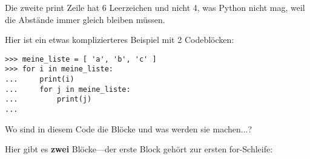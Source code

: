 Die zweite print Zeile hat 6 Leerzeichen und nicht 4, was Python nicht mag, weil die Abstände immer gleich bleiben müssen.


\par
Hier ist ein etwas komplizierteres Beispiel mit 2 Codeblöcken:

\begin{listing}
\begin{verbatim}
>>> meine_liste = [ 'a', 'b', 'c' ]
>>> for i in meine_liste:
...     print(i)
...     for j in meine_liste:
...         print(j)
...
\end{verbatim}
\end{listing}

\noindent
Wo sind in diesem Code die Blöcke und was werden sie machen...?
\par
\noindent
Hier gibt es \textbf{zwei} Blöcke---der erste Block gehört zur ersten for-Schleife:

